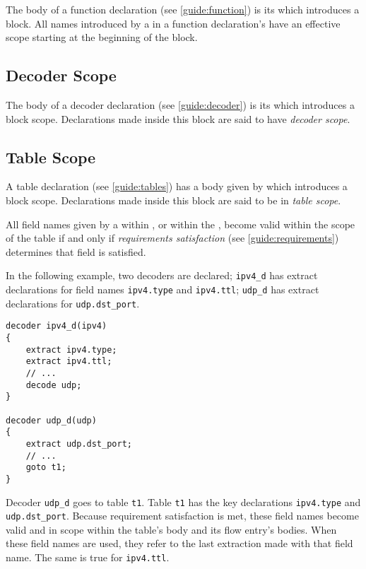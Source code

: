 The body of a function declaration (see \ref{guide:function}) is its  which introduces a block. All names introduced by a  in a function declaration's  have an effective scope starting at the beginning of the block.

\subsection{Decoder Scope} \label{guide:decoder_scope}

The body of a decoder declaration (see \ref{guide:decoder}) is its  which introduces a block scope. Declarations made inside this block are said to have \textit{decoder scope}.

\subsection{Table Scope} \label{guide:table_scope}

A table declaration (see \ref{guide:tables}) has a body given by  which introduces a block scope. Declarations made inside this block are said to be in \textit{table scope}.

All field names given by a  within , or within the , become valid within the scope of the table if and only if \textit{requirements satisfaction} (see \ref{guide:requirements}) determines that field is satisfied.

In the following example, two decoders are declared; \texttt{ipv4\_d} has extract declarations for field names \texttt{ipv4.type} and \texttt{ipv4.ttl}; \texttt{udp\_d} has extract declarations for \texttt{udp.dst\_port}.

\begin{minip}
\begin{lstlisting}
decoder ipv4_d(ipv4)
{
	extract ipv4.type;
	extract ipv4.ttl;
	// ...
	decode udp;
}

decoder udp_d(udp)
{
	extract udp.dst_port;
	// ...
	goto t1;
}
\end{lstlisting}
\end{minip}

Decoder \texttt{udp\_d} goes to table \texttt{t1}. Table \texttt{t1} has the key declarations \texttt{ipv4.type} and \texttt{udp.dst\_port}. Because requirement satisfaction is met, these field names become valid and in scope within the table's body and its flow entry's bodies. When these field names are used, they refer to the last extraction made with that field name. The same is true for \texttt{ipv4.ttl}.

